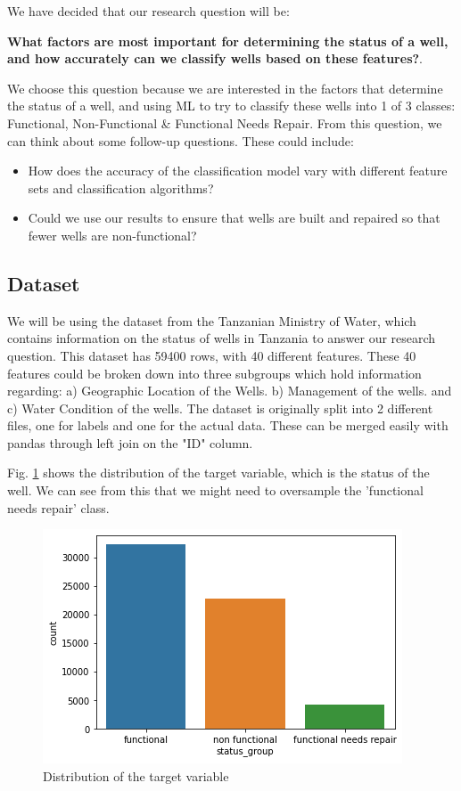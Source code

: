 \documentclass[conference]{IEEEtran}
\begin{document}
We have decided that our research question will be: 

\textbf{What factors are most important for determining the status of a well, and how accurately can we classify wells based on these features?}. 

We choose this question because we are interested in the factors that determine the status of a well, and using ML to try to classify these wells into 1 of 3 classes: Functional, Non-Functional \& Functional Needs Repair. From this question, we can think about some follow-up questions. These could include:
    \begin{itemize}
        \item How does the accuracy of the classification model vary with different feature sets and classification algorithms?
        \item Could we use our results to ensure that wells are built and repaired so that fewer wells are non-functional?
    \end{itemize}

\subsection{Dataset}

We will be using the dataset from the Tanzanian Ministry of Water, which contains information on the status of wells in Tanzania to answer our research question. This dataset has 59400 rows, with 40 different features. These 40 features could be broken down into three subgroups which hold information regarding: a) Geographic Location of the Wells. b) Management of the wells. and c) Water Condition of the wells. The dataset is originally split into 2 different files, one for labels and one for the actual data. These can be merged easily with pandas through left join on the "ID" column. 

Fig. \ref{fig:status_groups} shows the distribution of the target variable, which is the status of the well. We can see from this that we might need to oversample the 'functional needs repair' class.

\begin{figure}[h]
    \centering
    \includegraphics[scale=0.5]{figures/status_groups.png}
    \caption{Distribution of the target variable}
    \label{fig:status_groups}
\end{figure}
\end{document}
